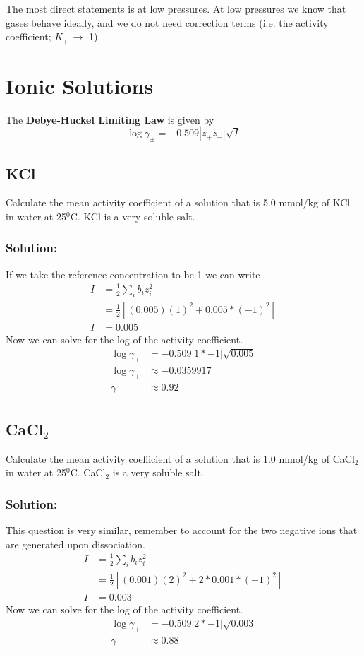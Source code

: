 \documentclass{article}
\newcommand{\be}{\begin{equation}}
\newcommand{\ee}{\end{equation}}
\begin{document}
The most direct statements is at low pressures.
At low pressures we know that gases behave ideally, and we do not need correction terms 
(i.e. the activity coefficient; $K_\gamma$ $\rightarrow$ 1). 

\newpage

\section{Ionic Solutions}
The \textbf{Debye-Huckel Limiting Law} is given by
\be
\log \gamma_\pm = -0.509|z_+z_-|\sqrt{I}
\ee

\subsection{KCl}
Calculate the mean activity coefficient of a solution that is 5.0 mmol/kg of KCl in water at 25$^0$C. 
KCl is a very soluble salt. 

\subsubsection*{Solution:}
If we take the reference concentration to be 1 we can write
\be
\begin{split}
I &= \frac{1}{2}\sum_i b_i z_i^2\\
&= \frac{1}{2} \left[(0.005)(1)^2 + 0.005*(-1)^2\right]\\
I &= 0.005
\end{split}
\ee
Now we can solve for the log of the activity coefficient. 
\be
\begin{split}
\log \gamma_\pm &=  -0.509|1*-1|\sqrt{0.005} \\
\log \gamma_\pm &\approx -0.0359917 \\
\gamma_\pm &\approx 0.92
\end{split}
\ee

\subsection{CaCl$_2$}
Calculate the mean activity coefficient of a solution that is 1.0 mmol/kg of CaCl$_2$ in water at 25$^0$C. 
CaCl$_2$ is a very soluble salt. 

\subsubsection*{Solution:} 
This question is very similar, remember to account for the two negative ions that are generated upon dissociation. 
\be
\begin{split}
I &= \frac{1}{2}\sum_i b_i z_i^2\\
&= \frac{1}{2} \left[(0.001)(2)^2 + 2*0.001*(-1)^2\right]\\
I &= 0.003
\end{split}
\ee
Now we can solve for the log of the activity coefficient. 
\be
\begin{split}
\log \gamma_\pm &=  -0.509|2*-1|\sqrt{0.003} \\
\gamma_\pm &\approx 0.88
\end{split}
\ee
\end{document}
